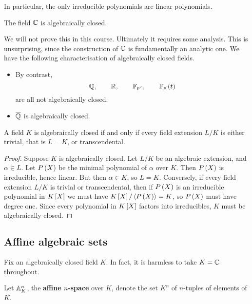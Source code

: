 In particular, the only irreducible polynomials are linear polynomials.

\begin{theorem}
The field $ \C $ is algebraically closed.
\end{theorem}

We will not prove this in this course. Ultimately it requires some analysis. This is unsurprising, since the construction of $ \C $ is fundamentally an analytic one. We have the following characterisation of algebraically closed fields.

\begin{example*}
\hfill
\begin{itemize}
\item By contrast,
$$ \Q, \qquad \R, \qquad \F_{p^r}, \qquad \F_p\rb{t} $$
are all not algebraically closed.
\item $ \overline{\Q} $ is algebraically closed.
\end{itemize}
\end{example*}

\begin{lemma}
A field $ K $ is algebraically closed if and only if every field extension $ L / K $ is either trivial, that is $ L = K $, or transcendental.
\end{lemma}

\begin{proof}
Suppose $ K $ is algebraically closed. Let $ L / K $ be an algebraic extension, and $ \alpha \in L $. Let $ P\rb{X} $ be the minimal polynomial of $ \alpha $ over $ K $. Then $ P\rb{X} $ is irreducible, hence linear. But then $ \alpha \in K $, so $ L = K $. Conversely, if every field extension $ L / K $ is trivial or transcendental, then if $ P\rb{X} $ is an irreducible polynomial in $ K\sb{X} $ we must have $ K\sb{X} / \ab{P\rb{X}} = K $, so $ P\rb{X} $ must have degree one. Since every polynomial in $ K\sb{X} $ factors into irreducibles, $ K $ must be algebraically closed.
\end{proof}

\subsection{Affine algebraic sets}

Fix an algebraically closed field $ K $. In fact, it is harmless to take $ K = \C $ throughout.

\begin{definition}
Let $ \A_K^n $, the \textbf{affine $ n $-space} over $ K $, denote the set $ K^n $ of $ n $-tuples of elements of $ K $.
\end{definition}

